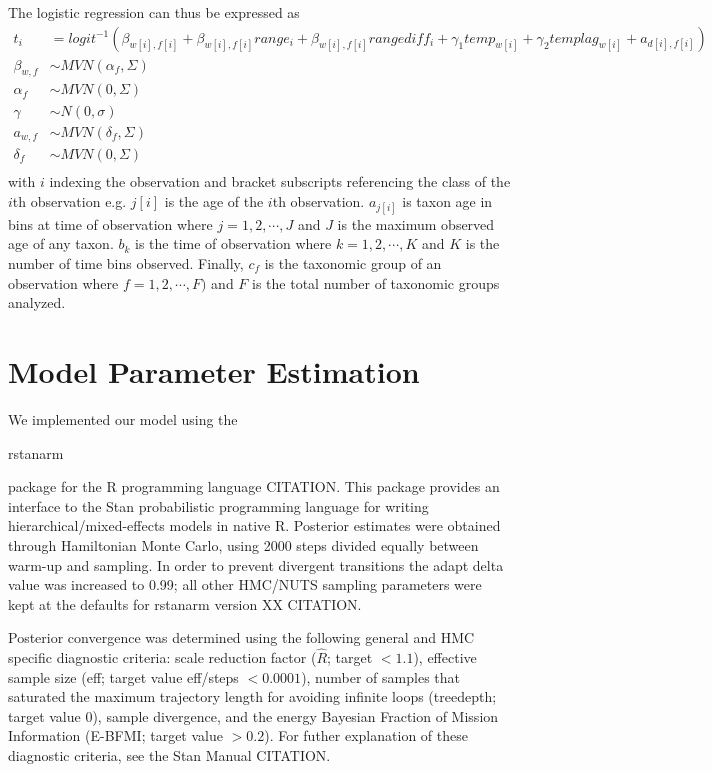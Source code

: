 \documentclass[12pt,letterpaper]{article}
\begin{document}
The logistic regression can thus be expressed as 
\begin{equation}
  \begin{aligned}
    t_{i} &= logit^{-1}(\beta_{w[i], f[i]} + \beta_{w[i], f[i]} range_{i} + \beta_{w[i], f[i]} rangediff_{i} + \gamma_{1} temp_{w[i]} + \gamma_{2} templag_{w[i]} + a_{d[i], f[i]}) \\
    \beta_{w, f} &\sim MVN(\alpha_{f}, \Sigma) \\
    \alpha_{f} &\sim MVN(0, \Sigma) \\
    \gamma &\sim N(0, \sigma) \\
    a_{w, f} &\sim MVN(\delta_{f}, \Sigma) \\
    \delta_{f} &\sim MVN(0, \Sigma) \\
  \end{aligned}
  \label{eq:core}
\end{equation}
with \(i\) indexing the observation and bracket subscripts referencing the class of the \(i\)th observation e.g. \(j[i]\) is the age of the \(i\)th observation. \(a_{j[i]}\) is taxon age in bins at time of observation where \(j = 1, 2, \cdots, J\) and \(J\) is the maximum observed age of any taxon. \(b_{k}\) is the time of observation where \(k = 1, 2, \cdots, K\) and \(K\) is the number of time bins observed. Finally, \(c_{f}\) is the taxonomic group of an observation where \(f = 1, 2, \cdots, F)\) and \(F\) is the total number of taxonomic groups analyzed.


\section{Model Parameter Estimation}

We implemented our model using the \begin{texttt}rstanarm\end{texttt} package for the R programming language CITATION. This package provides an interface to the Stan probabilistic programming language for writing hierarchical/mixed-effects models in native R. Posterior estimates were obtained through Hamiltonian Monte Carlo, using 2000 steps divided equally between warm-up and sampling. In order to prevent divergent transitions the adapt delta value was increased to 0.99; all other HMC/NUTS sampling parameters were kept at the defaults for rstanarm version XX CITATION. 

Posterior convergence was determined using the following general and HMC specific diagnostic criteria: scale reduction factor (\(\hat{R}\); target \(<1.1\)), effective sample size (eff; target value eff/steps \(<0.0001\)), number of samples that saturated the maximum trajectory length for avoiding infinite loops (treedepth; target value 0), sample divergence, and the energy Bayesian Fraction of Mission Information (E-BFMI; target value \(>0.2\)). For futher explanation of these diagnostic criteria, see the Stan Manual CITATION.
\end{document}
